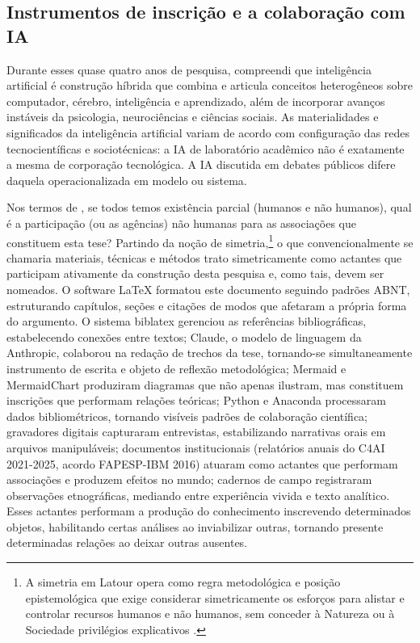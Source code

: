 \subsection*{Instrumentos de inscrição e a colaboração com IA}

Durante esses quase quatro anos de pesquisa, compreendi que inteligência artificial é construção híbrida que combina e articula conceitos heterogêneos sobre computador, cérebro, inteligência e aprendizado, além de incorporar avanços instáveis da psicologia, neurociências e ciências sociais. As materialidades e significados da inteligência artificial variam de acordo com configuração das redes tecnocientíficas e sociotécnicas: a IA de laboratório acadêmico não é exatamente a mesma de corporação tecnológica. A IA discutida em debates públicos difere daquela operacionalizada em modelo ou sistema.

Nos termos de \textcite{Latour1998Powers}, se todos temos existência parcial (humanos e não humanos), qual é a participação (ou as agências) não humanas para as associações que constituem esta tese? Partindo da noção de simetria,\footnote{A simetria em Latour opera como regra metodológica e posição epistemológica que exige considerar simetricamente os esforços para alistar e controlar recursos humanos e não humanos, sem conceder à Natureza ou à Sociedade privilégios explicativos \parencite{Latour2011CienciaEmAcao}.} o que convencionalmente se chamaria materiais, técnicas e métodos trato simetricamente como actantes que participam ativamente da construção desta pesquisa e, como tais, devem ser nomeados. O software LaTeX formatou este documento seguindo padrões ABNT, estruturando capítulos, seções e citações de modos que afetaram a própria forma do argumento. O sistema biblatex gerenciou as referências bibliográficas, estabelecendo conexões entre textos; Claude, o modelo de linguagem da Anthropic, colaborou na redação de trechos da tese, tornando-se simultaneamente instrumento de escrita e objeto de reflexão metodológica; Mermaid e MermaidChart produziram diagramas que não apenas ilustram, mas constituem inscrições que performam relações teóricas; Python e Anaconda processaram dados bibliométricos, tornando visíveis padrões de colaboração científica; gravadores digitais capturaram entrevistas, estabilizando narrativas orais em arquivos manipuláveis; documentos institucionais (relatórios anuais do C4AI 2021-2025, acordo FAPESP-IBM 2016) atuaram como actantes que performam associações e produzem efeitos no mundo; cadernos de campo registraram observações etnográficas, mediando entre experiência vivida e texto analítico. Esses actantes performam a produção do conhecimento inscrevendo determinados objetos, habilitando certas análises ao inviabilizar outras, tornando presente determinadas relações ao deixar outras ausentes.

